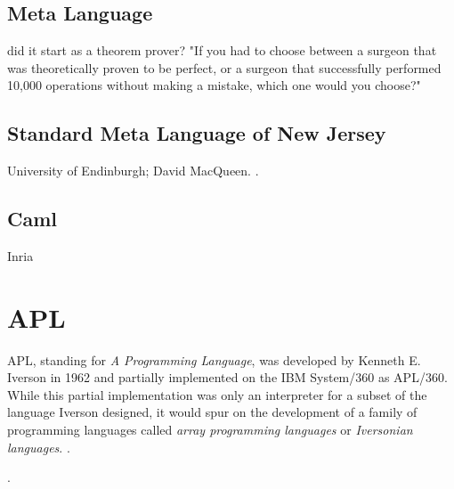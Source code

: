 \subsection{Meta Language}

did it start as a theorem prover?
"If you had to choose between a surgeon that was theoretically proven to
be perfect, or a surgeon that successfully performed 10,000 operations without
making a mistake, which one would you choose?"

\subsection{Standard Meta Language of New Jersey}

University of Endinburgh; David MacQueen.
.

\subsection{Caml}

Inria

\section{APL}

APL, standing for \textit{A Programming Language}, was developed by Kenneth E. Iverson in 1962
and partially implemented on the IBM System/360 as APL/360.
While this partial implementation was only an interpreter for a subset of the language Iverson
designed, it would spur on the development of a family of programming languages
called \textit{array programming languages} or \textit{Iversonian languages}.
.

.
